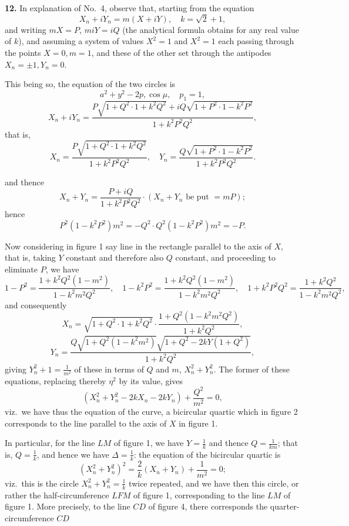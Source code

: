 \documentclass[11pt,a4paper]{article}
\begin{document}
\textbf{12.} In explanation of No.\ 4, observe that, starting from the equation
\[
X_n + iY_n = m(X + iY), \quad k = \sqrt{2} + 1,
\]
and writing $m X = P$, $m i Y = i Q$ (the analytical formula obtains for any real value of $k$), and assuming a system of values $X^2 = 1$ and $X^2 = 1$ each passing through the points $X = 0, m = 1$, and these of the other set through the antipodes $X_n = \pm 1, Y_n = 0$.

This being so, the equation of the two circles is
\[
a^2 + y^2 - 2p, \cos \mu, \quad p_1 = 1,
\]
\[
X_n + iY_n = \frac{P \sqrt{1 + Q^2 \cdot 1 + k^2 Q^2} + iQ \sqrt{1 + P^2 \cdot 1 - k^2 P^2}}{1 + k^2 P^2 Q^2},
\]
that is,
\[
X_n = \frac{P \sqrt{1 + Q^2 \cdot 1 + k^2 Q^2}}{1 + k^2 P^2 Q^2}, \quad Y_n = \frac{Q \sqrt{1 + P^2 \cdot 1 - k^2 P^2}}{1 + k^2 P^2 Q^2}.
\]

and thence
\[
X_n + Y_n = \frac{P + iQ}{1 + k^2 P^2 Q^2} \cdot (X_n + Y_n \text{ be put } = mP);
\]
hence
\[
P^2 (1 - k^2 P^2) m^2 = -Q^2 \cdot Q^2 (1 - k^2 P^2) m^2 = - P.
\]

Now considering in figure 1 say line in the rectangle parallel to the axis of $X$, that is, taking $Y$ constant and therefore also $Q$ constant, and proceeding to eliminate $P$, we have
\[
1 - P^2 = \frac{1 + k^2 Q^2 (1 - m^2)}{1 - k^2 m^2 Q^2}, \quad 1 - k^2 P^2 = \frac{1 + k^2 Q^2 (1 - m^2)}{1 - k^2 m^2 Q^2}, \quad 1 + k^2 P^2 Q^2 = \frac{1 + k^2 Q^2}{1 - k^2 m^2 Q^2},
\]
and consequently
\[
X_n = \sqrt{1 + Q^2 \cdot 1 + k^2 Q^2} \cdot \frac{1 + Q^2 (1 - k^2 m^2 Q^2)}{1 + k^2 Q^2},
\]
\[
Y_n = \frac{Q \sqrt{1 + Q^2(1 - k^2 m^2)} \sqrt{1 + Q^2 - 2 k Y (1 + Q^2)}}{1 + k^2 Q^2},
\]
giving $Y_n^2 + 1 = \frac{1}{m^2}$ of these in terms of $Q$ and $m$, $X_n^2 + Y_n^2$. The former of these equations, replacing thereby $\eta^2$ by its value, gives
\[
(X_n^2 + Y_n^2 - 2k X_n - 2 k Y_n) + \frac{Q^2}{m^2} = 0,
\]
viz.\ we have thus the equation of the curve, a bicircular quartic which in figure 2 corresponds to the line parallel to the axis of $X$ in figure 1.

In particular, for the line $LM$ of figure 1, we have $Y = \frac{1}{k}$ and thence $Q = \frac{1}{km}$; that is, $Q = \frac{1}{k}$, and hence we have $\Delta = \frac{1}{k}$: the equation of the bicircular quartic is
\[
(X_n^2 + Y_n^2)^2 = \frac{2}{k} (X_n + Y_n) + \frac{1}{m^2} = 0;
\]
viz.\ this is the circle $X_n^2 + Y_n^2 = \frac{1}{k}$ twice repeated, and we have then this circle, or rather the half-circumference $LFM$ of figure 1, corresponding to the line $LM$ of figure 1. More precisely, to the line $CD$ of figure 4, there corresponds the quarter-circumference $CD$
\end{document}
